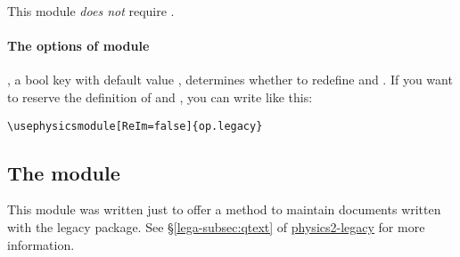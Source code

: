 \documentclass[11pt,letterpaper]{article}
\begin{document}
This module \emph{does not} require .

\paragraph{The options of  module}
, a bool key with default value , determines whether to
redefine  and . If you want to reserve the definition of
 and , you can write like this:
\begin{Verbatim}
\usephysicsmodule[ReIm=false]{op.legacy}
\end{Verbatim}

\subsection{The  module}
This module was written just to offer a method to maintain documents written
with the legacy  package. See \S\ref*{lega-subsec:qtext} of
\href{./physics2-legacy.pdf}{physics2-legacy} for more information.
\end{document}

